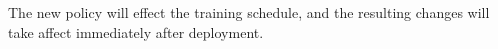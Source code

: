 The new policy will effect the training schedule, and the resulting changes will take affect immediately after deployment.
